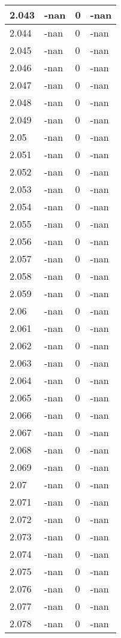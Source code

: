 \documentclass[a4paper,14pt]{extarticle}
\begin{document}
\begin{longtable}{||m{3cm}||m{3cm}|m{3cm}||m{3cm}||}
\hline
2.043 & -nan & 0 & -nan\\
\hline
2.044 & -nan & 0 & -nan\\
\hline
2.045 & -nan & 0 & -nan\\
\hline
2.046 & -nan & 0 & -nan\\
\hline
2.047 & -nan & 0 & -nan\\
\hline
2.048 & -nan & 0 & -nan\\
\hline
2.049 & -nan & 0 & -nan\\
\hline
2.05 & -nan & 0 & -nan\\
\hline
2.051 & -nan & 0 & -nan\\
\hline
2.052 & -nan & 0 & -nan\\
\hline
2.053 & -nan & 0 & -nan\\
\hline
2.054 & -nan & 0 & -nan\\
\hline
2.055 & -nan & 0 & -nan\\
\hline
2.056 & -nan & 0 & -nan\\
\hline
2.057 & -nan & 0 & -nan\\
\hline
2.058 & -nan & 0 & -nan\\
\hline
2.059 & -nan & 0 & -nan\\
\hline
2.06 & -nan & 0 & -nan\\
\hline
2.061 & -nan & 0 & -nan\\
\hline
2.062 & -nan & 0 & -nan\\
\hline
2.063 & -nan & 0 & -nan\\
\hline
2.064 & -nan & 0 & -nan\\
\hline
2.065 & -nan & 0 & -nan\\
\hline
2.066 & -nan & 0 & -nan\\
\hline
2.067 & -nan & 0 & -nan\\
\hline
2.068 & -nan & 0 & -nan\\
\hline
2.069 & -nan & 0 & -nan\\
\hline
2.07 & -nan & 0 & -nan\\
\hline
2.071 & -nan & 0 & -nan\\
\hline
2.072 & -nan & 0 & -nan\\
\hline
2.073 & -nan & 0 & -nan\\
\hline
2.074 & -nan & 0 & -nan\\
\hline
2.075 & -nan & 0 & -nan\\
\hline
2.076 & -nan & 0 & -nan\\
\hline
2.077 & -nan & 0 & -nan\\
\hline
2.078 & -nan & 0 & -nan\\

\end{longtable}
\end{document}
